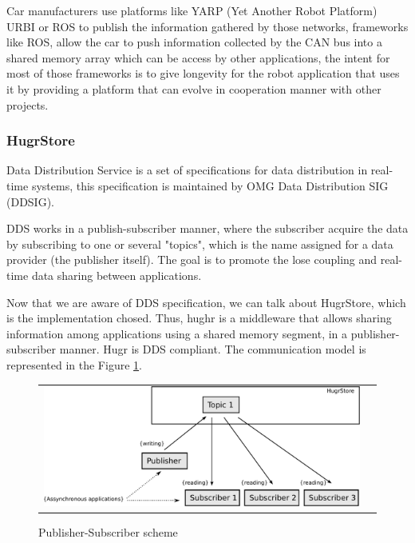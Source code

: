 Car manufacturers use platforms like YARP (Yet Another Robot Platform) URBI or ROS to publish the information gathered by those networks, frameworks like ROS, allow the car to push information collected by the CAN bus into a shared memory array which can be access by other applications, the intent for most of those frameworks is to give longevity\cite{Fitzpatrick:2008:TLR:1327539.1327705} for the robot application that uses it by providing a platform that can evolve in cooperation manner with other projects.


\subsubsection*{HugrStore}

Data Distribution Service\cite{dds} is a set of specifications for data distribution in real-time systems, this specification is maintained by OMG Data Distribution SIG (DDSIG).

DDS works in a publish-subscriber manner, where the subscriber acquire the data by subscribing to one or several  "topics", which is the name assigned for a data provider (the publisher itself). The goal is to promote the lose coupling and real-time data sharing between applications.

Now that we are aware of DDS specification, we can talk about HugrStore, which is the implementation chosed. Thus, hughr is a middleware that allows sharing information among applications using a shared memory segment, in a publisher-subscriber manner. Hugr is DDS compliant. The communication model is represented in the Figure \ref{fig:dds:hugr}.

\begin{figure}[H]
   \centering
     \begin{tabular}{lr}
       \includegraphics[scale=0.50]{img/fig:dds:hugr}
     \end{tabular}
   \caption{Publisher-Subscriber scheme}
   \label{fig:dds:hugr}
\end{figure}


